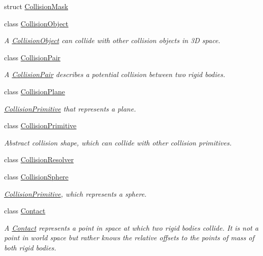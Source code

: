 \begin{DoxyCompactItemize}
\item 
struct \mbox{\hyperlink{structr3_1_1_collision_mask}{Collision\+Mask}}
\item 
class \mbox{\hyperlink{classr3_1_1_collision_object}{Collision\+Object}}
\begin{DoxyCompactList}\small\item\em A \mbox{\hyperlink{classr3_1_1_collision_object}{Collision\+Object}} can collide with other collision objects in 3D space. \end{DoxyCompactList}\item 
class \mbox{\hyperlink{classr3_1_1_collision_pair}{Collision\+Pair}}
\begin{DoxyCompactList}\small\item\em A \mbox{\hyperlink{classr3_1_1_collision_pair}{Collision\+Pair}} describes a potential collision between two rigid bodies. \end{DoxyCompactList}\item 
class \mbox{\hyperlink{classr3_1_1_collision_plane}{Collision\+Plane}}
\begin{DoxyCompactList}\small\item\em \mbox{\hyperlink{classr3_1_1_collision_primitive}{Collision\+Primitive}} that represents a plane. \end{DoxyCompactList}\item 
class \mbox{\hyperlink{classr3_1_1_collision_primitive}{Collision\+Primitive}}
\begin{DoxyCompactList}\small\item\em Abstract collision shape, which can collide with other collision primitives. \end{DoxyCompactList}\item 
class \mbox{\hyperlink{classr3_1_1_collision_resolver}{Collision\+Resolver}}
\item 
class \mbox{\hyperlink{classr3_1_1_collision_sphere}{Collision\+Sphere}}
\begin{DoxyCompactList}\small\item\em \mbox{\hyperlink{classr3_1_1_collision_primitive}{Collision\+Primitive}}, which represents a sphere. \end{DoxyCompactList}\item 
class \mbox{\hyperlink{classr3_1_1_contact}{Contact}}
\begin{DoxyCompactList}\small\item\em A \mbox{\hyperlink{classr3_1_1_contact}{Contact}} represents a point in space at which two rigid bodies collide. It is not a point in world space but rather knows the relative offsets to the points of mass of both rigid bodies. \end{DoxyCompactList}\item 

\end{DoxyCompactItemize}
